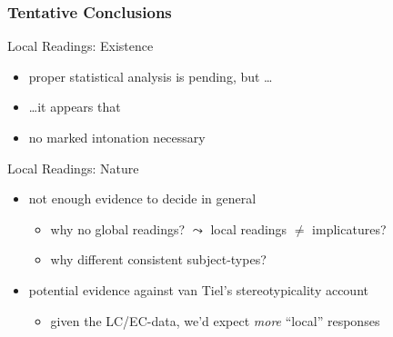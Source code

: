 \documentclass[fleqn,10pt,xcolor=dvipsnames]{beamer}
\newcommand{\LC}{LC\xspace}
\newcommand{\EC}{EC\xspace}
\newcommand{\mymark}[1]{{\color{mycol}{#1}}}
\begin{document}
\begin{frame}
  \frametitle{Tentative Conclusions}
  \begin{block}{Local Readings: Existence}
    \begin{itemize}
    \item proper statistical analysis is pending, but \dots
    \item \dots it appears that \mymark{local readings exist but are dispreferred}
    \item no marked intonation necessary
    \end{itemize}
  \end{block}
  
  \begin{block}{Local Readings: Nature}
    \begin{itemize}
    \item not enough evidence to decide in general
      \begin{itemize}
      \item why no global readings? $\leadsto$ local readings $\neq$ implicatures?
      \item why different consistent subject-types?
      \end{itemize}
    \item potential evidence against van Tiel's stereotypicality account
      \begin{itemize}
      \item given the \LC/\EC-data, we'd expect \emph{more} ``local''
        responses
      \end{itemize}
    \end{itemize}
  \end{block}

\end{frame}



\begin{frame}

    \printbibliography[heading=subbibliography]

\end{frame}
\end{document}
